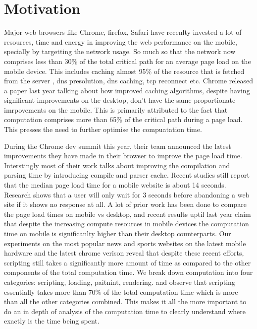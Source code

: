 \section{Motivation}
\label{sec:motivation}


Major web browsers like Chrome, firefox, Safari have recenlty invested a lot of resources,
time and energy in improving the web performance on the mobile, specially by targetting 
the network usage. So much so that the network now comprises less than 30\% \cite{njait2016www} of the total critical
path for an average page load on the mobile device. This includes caching almost 95\% of the
resource that is fetched from the server \cite{vesuna2016caching}, dns presolution, dns caching, tcp reconnect etc.
Chrome released a paper last year talking about how improved caching algorithms, despite having 
significant improvements on the desktop, don't have the same proportionate imrpovements 
on the mobile. This is primarily attributed to the fact that computation comprises more than 65\%
of the critical path during a page load. This presses the need to further optimise the compuatation 
time. 

During the Chrome dev summit this year, their team announced the latest improvements they have 
made in their browser to improve the page load time. Interstingly most of their work talks about
improving the compilation and parsing time by introducing compile and parser cache. 
Recent studies \cite{url4} still report that the median page load time for a mobile website 
is about 14 seconds. Research \cite{url4} shows that a user will only wait for 3 seconds 
before abandoning a web site if it shows no response at all. A lot of prior work \cite {njait2016www}
has been done to compare the page load times on mobile vs desktop, and recent results
uptil last year claim that despite the increasing compute resources in mobile devices 
the computation time on mobile is significanlty higher than their desktop counterparts. 
 Our experiments
on the most popular news and sports websites on the latest mobile hardware and the latest 
chrome verison reveal that despite these recent efforts, scripting still takes a significantly more
amount of time as compared to the other components of the total computation time. We break down computation
into four categories: scripting, loading, paitnint, rendering.
and observe that scripting essentially takes more than 70\% of the total
computation time which is more than all the other categories combined. 
This makes it all the more important to do an in depth of analysis of the computation time to clearly
understand where exactly is the time being spent. 
